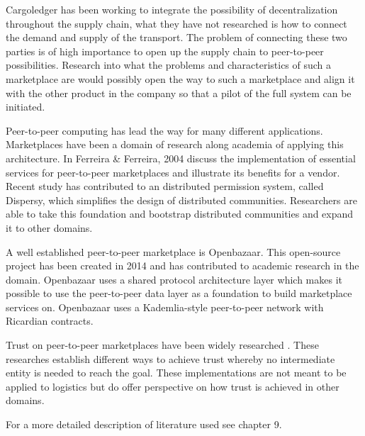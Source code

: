 \documentclass[11pt]{article}
\begin{document}
Cargoledger has been working to integrate the possibility of decentralization throughout the supply chain, what they have not researched is how to connect the demand and supply of the transport. The problem of connecting these two parties is of high importance to open up the supply chain to peer-to-peer possibilities. Research into what the problems and characteristics of such a marketplace are would possibly open the way to such a marketplace and align it with the other product in the company so that a pilot of the full system can be initiated. \par
Peer-to-peer computing \cite{peer2peer} has lead the way for many different applications. Marketplaces have been a domain of research along academia of applying this architecture. In \cite{buildingp2pmarketplace} Ferreira \& Ferreira, 2004 discuss the implementation of essential services for peer-to-peer marketplaces and illustrate its benefits for a vendor. Recent study \cite{challangeDecentralizedMarketplaces}\cite{decentralMarket} has contributed to an distributed permission system, called Dispersy, which simplifies the design of distributed communities. Researchers are able to take this foundation and bootstrap distributed communities and expand it to other domains.\par
A well established peer-to-peer marketplace is Openbazaar. This open-source project has been created in 2014 and has contributed to academic research in the domain\cite{openbazaar}. Openbazaar uses a shared protocol architecture layer which makes it possible to use the peer-to-peer data layer as a foundation to build marketplace services on. Openbazaar uses a Kademlia-style peer-to-peer network with Ricardian contracts.\par
Trust on peer-to-peer marketplaces have been widely researched \cite{buildTrust}\cite{trustlessIntermediationInBCServiceMarket}\cite{Serban2008}. These researches establish different ways to achieve trust whereby no intermediate entity is needed to reach the goal. These implementations are not meant to be applied to logistics but do offer perspective on how trust is achieved in other domains.\par
\bigbreak
\noindent For a more detailed description of literature used see chapter 9.
\end{document}
